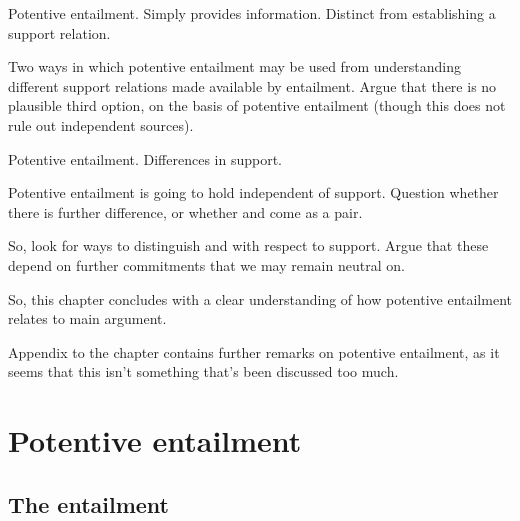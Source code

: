 \begin{note}
  Potentive entailment.
  Simply provides information.
  Distinct from establishing a support relation.

  Two ways in which potentive entailment may be used from understanding different support relations made available by entailment.
  Argue that there is no plausible third option, on the basis of potentive entailment (though this does not rule out independent sources).
\end{note}

\begin{note}
  Potentive entailment.
  Differences in support.

  Potentive entailment is going to hold independent of support.
  Question whether there is further difference, or whether \AR{} and \WR{} come as a pair.

  So, look for ways to distinguish \AR{} and \WR{} with respect to support.
  Argue that these depend on further commitments that we may remain neutral on.
\end{note}

\begin{note}[Wrapping up]
  So, this chapter concludes with a clear understanding of how potentive entailment relates to main argument.
\end{note}

\begin{note}[Extras]
  Appendix to the chapter contains further remarks on potentive entailment, as it seems that this isn't something that's been discussed too much.
\end{note}


\section{Potentive entailment}
\label{sec:potentive-entailment}

\subsection{The entailment}
\label{sec:entailment}

